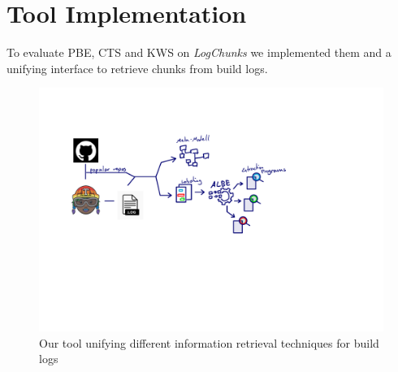 \documentclass[\myrootdir/main.tex]{subfiles}
\begin{document}
\chapter{Tool Implementation}
\label{sec:implementation}
To evaluate PBE, CTS and KWS on \emph{LogChunks} we implemented them and a unifying interface to retrieve chunks from build logs.

\begin{figure}[h]
	\centering
	\includegraphics[page=7, width=\textwidth, trim={0.5cm 0.5cm 0.5cm 0.5cm}, clip]{img/flow-of-research.pdf}
	\caption{Our tool unifying different information retrieval techniques for build logs}
	\label{fig:tool}
\end{figure}

\end{document}

